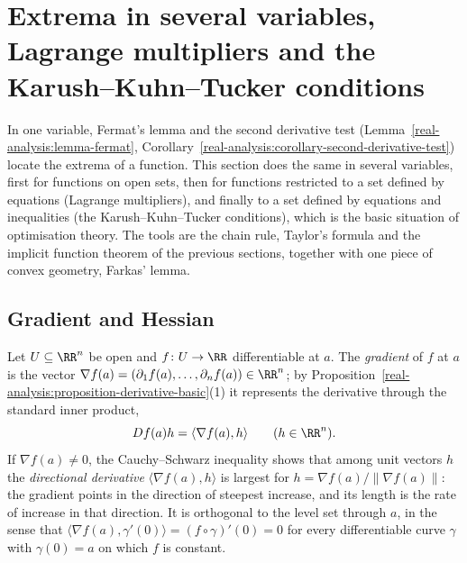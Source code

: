 \section{Extrema in several variables, Lagrange multipliers and the Karush--Kuhn--Tucker conditions}\label{real-analysis:section-extrema}

In one variable, Fermat's lemma and the second derivative test (Lemma~\ref{real-analysis:lemma-fermat}, Corollary~\ref{real-analysis:corollary-second-derivative-test}) locate the extrema of a function.
This section does the same in several variables, first for functions on open sets, then for functions restricted to a set defined by equations (Lagrange multipliers), and finally to a set
defined by equations and inequalities (the Karush--Kuhn--Tucker conditions), which is the basic situation of optimisation theory. The tools are the chain rule, Taylor's formula and the implicit
function theorem of the previous sections, together with one piece of convex geometry, Farkas' lemma.

\subsection{Gradient and Hessian}\label{real-analysis:subsection-gradient-hessian}

Let $U \subseteq \RR^n$ be open and $f \colon U \to \RR$ differentiable at $a$. The \emph{gradient} of $f$ at $a$ is the vector $\nabla f(a) = (\partial_1f(a), \ldots, \partial_nf(a)) \in \RR^n$; by
Proposition~\ref{real-analysis:proposition-derivative-basic}(1) it represents the derivative through the standard inner product,
\[
Df(a)h = \langle\nabla f(a), h\rangle \qquad (h \in \RR^n).
\]
If $\nabla f(a) \neq 0$, the Cauchy--Schwarz inequality shows that among unit vectors $h$ the \emph{directional derivative} $\langle\nabla f(a), h\rangle$ is largest for $h = \nabla f(a)/\|\nabla f(a)\|$: the
gradient points in the direction of steepest increase, and its length is the rate of increase in that direction. It is orthogonal to the level set through $a$, in the sense that
$\langle\nabla f(a), \gamma'(0)\rangle = (f \circ \gamma)'(0) = 0$ for every differentiable curve $\gamma$ with $\gamma(0) = a$ on which $f$ is constant.

